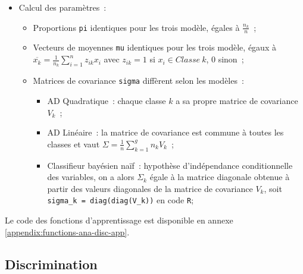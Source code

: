 \documentclass[a4paper,10pt]{report}
\begin{document}
\begin{itemize}
	\item Calcul des paramètres~:
	\begin{itemize}
		\item Proportions \texttt{pi} identiques pour les trois modèle, égales à $\frac{n_k}{n}$~;
		\item Vecteurs de moyennes \texttt{mu} identiques pour les trois modèle, égaux à $\overline{x_k} = \frac{1}{n_k} \sum_{i=1}^{n} z_{ik}x_i$ avec $z_{ik} = 1$ si $x_i \in Classe\ k$, $0$ sinon~;
		\item Matrices de covariance \texttt{sigma} diffèrent selon les modèles~:
		\begin{itemize}
			\item AD Quadratique~: chaque classe $k$ a sa propre matrice de covariance $V_k$~;
			\item AD Linéaire~: la matrice de covariance est commune à toutes les classes et vaut $\Sigma = \frac{1}{n} \sum_{k=1}^{g} n_k V_k$~;
			\item Classifieur bayésien naïf~: hypothèse d'indépendance conditionnelle des variables, on a alors $\Sigma_k$ égale à la matrice diagonale obtenue à partir des valeurs diagonales de la matrice de covariance $V_k$, soit \texttt{sigma\_k = diag(diag(V\_k))} en code \texttt{R};
		\end{itemize}
	\end{itemize}
\end{itemize}

Le code des fonctions d'apprentissage est disponible en annexe \ref{appendix:functions-ana-disc-app}.

\subsection{Discrimination}
\end{document}
